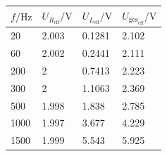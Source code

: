 \documentclass[a4paper, 12pt]{article}
\begin{document}
      \begin{table}[H]
      \begin{center}
      \begin{tabular}{@{}llll@{}}
      \toprule
      $f/\si{\hertz}$   & $U_{R_{\text{eff}}}/\si{\volt}$ & $U_{L_{\text{eff}}}/\si{\volt}$  & $U_{\text{ges}_{\text{eff}}}/\si{\volt}$ \\ \midrule
      20   & 2.003 & 0.1281 & 2.102 \\
      60   & 2.002 & 0.2441 & 2.111 \\
      200  & 2     & 0.7413 & 2.223 \\
      300  & 2     & 1.1063 & 2.369 \\
      500  & 1.998 & 1.838  & 2.785 \\
      1000 & 1.997 & 3.677  & 4.229 \\
      1500 & 1.999 & 5.543  & 5.925 \\ \bottomrule
      \end{tabular}
      \end{center}
      \end{table}
\end{document}
